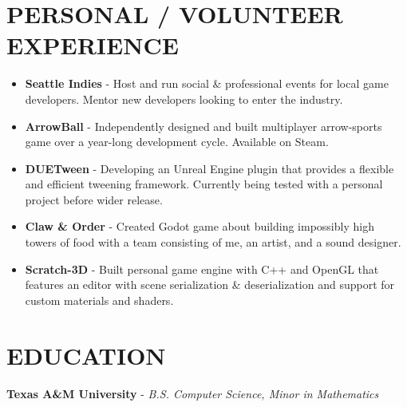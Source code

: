 \documentclass[resmargin,10pt]{res} %
\begin{document}
\begin{resume}
    \section{PERSONAL / VOLUNTEER EXPERIENCE}
    \begin{itemize}
        \setlength\itemsep{-0.0em}
        \item \textbf{Seattle Indies} - Host and run social \& professional events for local game developers. Mentor new developers looking to enter the industry.
        \item \textbf{ArrowBall} - Independently designed and built multiplayer arrow-sports game over a year-long development cycle. Available on Steam.
        \item \textbf{DUETween} - Developing an Unreal Engine plugin that provides a flexible and efficient tweening framework. Currently being tested with a personal project before wider release.
        \item \textbf{Claw \& Order} - Created Godot game about building impossibly high towers of food with a team consisting of me, an artist, and a sound designer.
        \item \textbf{Scratch-3D} - Built personal game engine with C++ and OpenGL that features an editor with scene serialization \& deserialization and support for custom materials and shaders.
    \end{itemize}

    \section{EDUCATION}
     {\bf Texas A\&M University} - \textit{B.S. Computer Science, Minor in Mathematics}
\end{resume}
\end{document}
